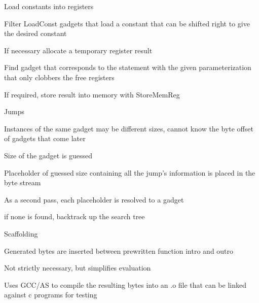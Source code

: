                             Load constants into registers

                                Filter LoadConst gadgets that load a constant
                                that can be shifted right to give the desired
                                constant

                                If necessary allocate a temporary register
                                result

                                Find gadget that corresponds to the statement
                                with the given parameterization that only
                                clobbers the free registers

                                If required, store result into memory with
                                StoreMemReg

                        Jumps

                            Instances of the same gadget may be different sizes,
                            cannot know the byte offset of gadgets that come
                            later

                            Size of the gadget is guessed

                            Placeholder of guessed size containing all the
                            jump’s information is placed in the byte stream

                            As a second pass, each placeholder is resolved to a
                            gadget

                                if none is found, backtrack up the search tree


                    Scaffolding

                        Generated bytes are inserted between prewritten function
                        intro and outro

                            Not strictly necessary, but simplifies evaluation

                        Uses GCC/AS to compile the resulting bytes into an .o
                        file that can be linked against c programs for testing


